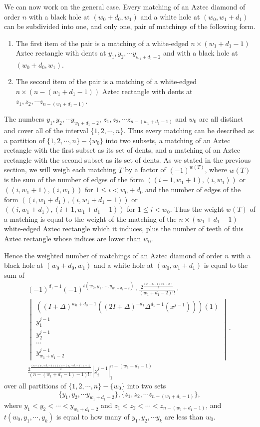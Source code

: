 \documentclass[10pt,reqno]{amsart}
\theoremstyle{plain}
\theoremstyle{definition}
\theoremstyle{remark}
\def\determinant#1{\left|#1\right|}
\begin{document}
We can now work on the general case. Every matching of an
Aztec diamond of order $n$ with a black hole
at $(w_0+d_0,w_1)$ and a white hole at
$(w_0,w_1+d_1)$ can be subdivided
into one, and only one, pair of matchings of the following form.
\begin{enumerate}
\item The first item of the pair is a matching of a white-edged
$n\times (w_1+d_1-1)$ Aztec rectangle with dents at 
$y_1,y_2,\dotsb y_{w_1+d_1-2}$ and with a black hole at $(w_0+d_0,w_1)$.
\item The second item of the pair is a matching of a white-edged
$n\times (n-(w_1+d_1-1))$ Aztec rectangle with dents at 
$z_1,z_2,\dotsb z_{n-(w_1+d_1-1)}$. 
\end{enumerate}
The numbers $y_1,y_2,\dotsb y_{w_1+d_1-2}$,
$z_1,z_2,\dotsb z_{n-(w_1+d_1-1)}$ and $w_0$ are all distinct and cover all
of the interval $\{1,2,\dotsb ,n\}$. Thus every matching can be
described as a partition of $\{1,2,\dotsb ,n\}-\{w_0\}$ into two subsets,
a matching of an Aztec rectangle with the first subset as its set of dents,
and 
a matching of an Aztec rectangle with the second subset as its set of dents.
As we stated in the
previous section, we will weigh each matching $T$
 by a factor of $(-1)^{w(T)}$, where
$w(T)$ is the sum of the number of edges of the form
$((i-1,w_1+1),(i,w_1))$ or $((i,w_1+1),(i,w_1))$ for $1\leq i<w_0+d_0$
and the number of edges of the form
$((i,w_1+d_1),(i,w_1+d_1-1))$ or $((i,w_1+d_1),(i+1,w_1+d_1-1))$
for $1\leq i<w_0$. Thus
the weight $w(T)$ of a matching is equal to the weight of the matching
of the $n\times (w_1+d_1-1)$ white-edged Aztec rectangle which it induces, plus
the number of teeth of this Aztec rectangle whose indices are lower
than $w_0$.

Hence the weighted number of matchings of an Aztec diamond of order $n$ with a
 black hole at $(w_0+d_0,w_1)$ and a white hole at $(w_0,w_1+d_1)$
is equal to the sum of
\begin{equation}
\begin{aligned}
(-1)^{d_1-1} (-1)^{t(w_0,y_1,\dotsb,y_{w_1+d_1-2})}\cdot
\frac{2^{\frac{(w_1+d_1-1)(w_1+d_1)}{2}}}{(w_1+d_1-2)!!}\cdot \\
\begin{vmatrix}
((I+\Delta)^{w_0+d_0-1}((2I+\Delta)^{-d_1}\Delta^{d_1-1}(x^{j-1})))(1) \\
y_1^{j-1} \\
y_2^{j-1} \\
\dotsb \\
y_{w_1+d_1-2}^{j-1} 
\end{vmatrix}
\cdot \\
\frac{2^{\frac{(n-(w_1+d_1-1))((n-(w_1+d_1-1))+1)}{2}}}
	{(n-(w_1+d_1-1)-1)!!} 
\determinant{z_i^{j-1}}_1^{n-(w_1+d_1-1)}
\end{aligned}
\end{equation}
over all partitions of $\{1,2,\dotsb ,n\} - \{ w_0 \}$ into two sets
\[\{y_1,y_2,\dotsb y_{w_1+d_1-2}\}, \{z_1,z_2,\dotsb z_{n-(w_1+d_1-1)}\},\]
where 
$y_1<y_2<\dotsb <y_{w_1+d_1-2}$ and
$z_1<z_2<\dotsb <z_{n-(w_1+d_1-1)}$, and 
$t(w_0,y_1,\dotsb,y_k)$ is equal to how many of $y_1,y_2,\dotsb y_k$ are
less than $w_0$.
\end{document}
